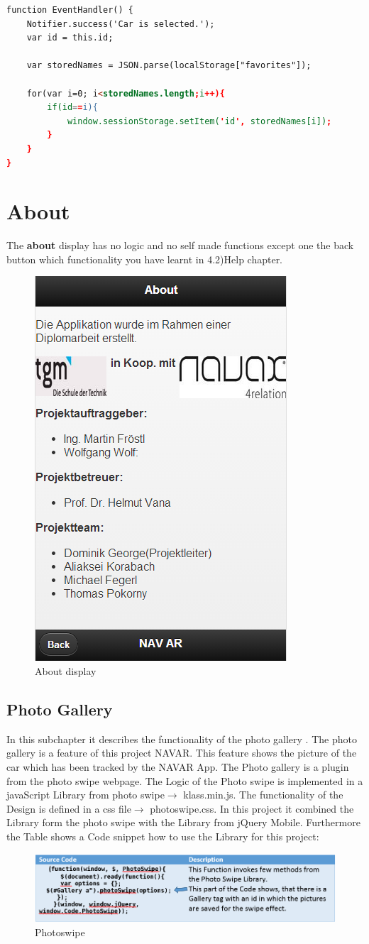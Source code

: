 \begin{lstlisting}[language=html, caption=
Select car function,captionpos=b] 
function EventHandler() {
	Notifier.success('Car is selected.');
	var id = this.id;
	
	var storedNames = JSON.parse(localStorage["favorites"]);
	
	for(var i=0; i<storedNames.length;i++){
		if(id==i){
			window.sessionStorage.setItem('id', storedNames[i]);
		}
	}
}
\end{lstlisting}

\section{About}
The \textbf{about} display has no logic and no self made functions except one the back button which functionality you have learnt in 4.2)Help chapter.
\\
\begin{figure}[h]
\centering
\includegraphics[width=0.4\linewidth]{graphics/chapter4/17}
\caption{About display}
\label{fig:18}
\end{figure}


\subsection{Photo Gallery}
In this subchapter it describes the functionality of the photo gallery . The photo gallery is a feature of this project NAVAR. This feature shows the picture of the car which has been tracked by the NAVAR App. The Photo gallery is a plugin  from the photo swipe webpage. The Logic of the Photo swipe is implemented in a javaScript Library from photo swipe$\rightarrow$ klass.min.js. The functionality of the Design is defined in a css file$\rightarrow$ photoswipe.css. In this project it combined the Library form the photo swipe with the Library from jQuery Mobile. Furthermore the Table shows a Code snippet how to use the Library for this project:
\begin{figure}[htbp]
\centering
\includegraphics[width=0.4\linewidth]{graphics/photoswipe.PNG}
\caption{Photoswipe}
\end{figure}

